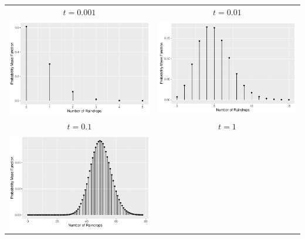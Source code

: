 \begin{frame}
  \begin{block}{\examplectd}
    \begin{center}
      \begin{tabular}{cc}
        $t=0.001$
        &$t=0.01$
        \\
        \includegraphics[width=.4\textheight]{figure/rainfall-1}
        & \includegraphics[width=.4\textheight]{figure/rainfall-2} \\
        $t=0.1$
        &$t=1$
        \\
        \includegraphics[width=.4\textheight]{figure/rainfall-3}

\end{tabular}
\end{center}
\end{block}
\end{frame}
